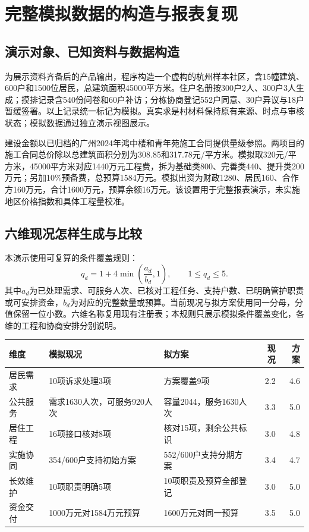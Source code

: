 \section{完整模拟数据的构造与报表复现}\label{app:simulation}
\subsection{演示对象、已知资料与数据构造}
为展示资料齐备后的产品输出，程序构造一个虚构的杭州样本社区，含15幢建筑、600户和1500位居民，总建筑面积45000平方米。住户名册按300户2人、300户3人生成；摸排记录含540份问卷和60户补访；分栋协商登记552户同意、30户异议与18户暂缓签署。以上记录统一标记为模拟。真实求是村材料保持原有来源、时点与审核状态；模拟数据通过独立演示视图展示。

建设金额以已归档的广州2024年鸿中楼和青年苑施工合同提供量级参照。两项目的施工合同总价除以总建筑面积分别为308.85和317.78元/平方米。模拟取320元/平方米，45000平方米对应1440万元工程费，拆为基础类800、完善类440、提升类200万元；另加10\%预备费，总预算1584万元。模拟出资为财政1280、居民160、合作方160万元，合计1600万元，预算余额16万元。该设置用于完整报表演示，未实施地区价格指数和具体工程量校准。

\subsection{六维现况怎样生成与比较}
本演示使用可复算的条件覆盖规则：
\[
 q_d=1+4\min\!\left(\frac{a_d}{b_d},1\right),\qquad 1\le q_d\le5.
\]
其中$a_d$为已处理需求、可服务人次、已核对工程任务、支持户数、已明确管护职责或可安排资金，$b_d$为对应的完整数量或预算。当前现况与拟方案使用同一分母，分值保留一位小数。六维名称复用现有注册表；本规则只展示模拟条件覆盖变化，各维的工程和协商安排分别说明。
\begin{center}\small
\begin{tabularx}{\linewidth}{@{}lXXrr@{}}\toprule
维度&模拟现况&拟方案&现况&方案\\\midrule
居民需求&10项诉求处理3项&方案覆盖9项&2.2&4.6\\
公共服务&需求1630人次，可服务920人次&容量2044，服务1630人次&3.3&5.0\\
居住工程&16项接口核对8项&核对15项，剩余公共标识&3.0&4.8\\
实施协同&354/600户支持初始方案&552/600户支持分期方案&3.4&4.7\\
长效维护&10项职责明确5项&10项职责及预算全部登记&3.0&5.0\\
资金交付&1000万元对1584万元预算&1600万元对同一预算&3.5&5.0\\\bottomrule
\end{tabularx}\end{center}


